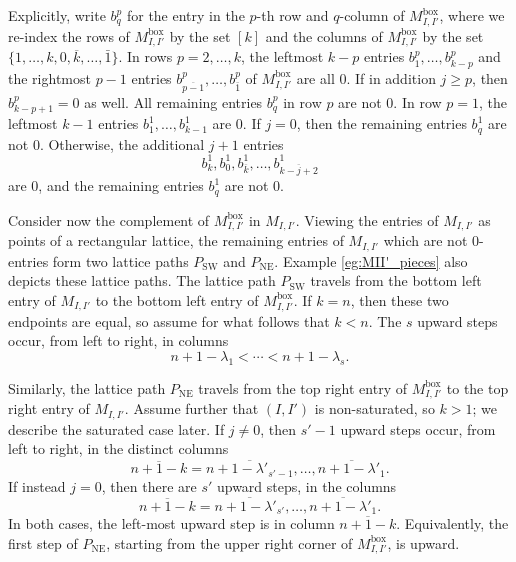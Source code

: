 \documentclass[12pt]{amsart}
\DeclareMathOperator{\inbox}{box}
\DeclareMathOperator{\NE}{NE}
\DeclareMathOperator{\SW}{SW}
\newcommand{\bark}{\overline{k}}
\begin{document}
Explicitly, write $b^p_q$ for the entry in the $p$-th row and $q$-column of $M^{\inbox}_{I,I'}$, where we re-index the rows of $M^{\inbox}_{I,I'}$ by the set $[k]$ and the columns of $M^{\inbox}_{I,I'}$ by the set $\{1,\ldots,k,0,\bark,\ldots, \bar1\}$. In rows $p=2,\ldots,k$, the leftmost $k-p$ entries $b^p_1,\ldots,b^p_{k-p}$ and the rightmost $p-1$ entries $b^p_{\overline{p-1}},\ldots,b^p_{\bar1}$ of $M^{\inbox}_{I,I'}$ are all 0. If in addition $j\ge p$, then $b^p_{k-p+1}=0$ as well. All remaining entries $b^p_q$ in row $p$ are not 0. In row $p=1$, the leftmost $k-1$ entries $b^1_1,\ldots,b^1_{k-1}$ are 0. If $j=0$, then the remaining entries $b^1_q$ are not 0. Otherwise, the additional $j+1$ entries
\begin{equation*}
    b^1_k,b^1_0,b^1_{\bark},\ldots,b^1_{\overline{k-j+2}}
\end{equation*}
are 0, and the remaining entries $b^1_q$ are not 0.

Consider now the complement of $M^{\inbox}_{I,I'}$ in $M_{I,I'}$. Viewing the entries of $M_{I,I'}$ as points of a rectangular lattice, the remaining entries of $M_{I,I'}$ which are not 0-entries form two lattice paths $P_{\SW}$ and $P_{\NE}$. Example \ref{eg:MII'_pieces} also depicts these lattice paths. The lattice path $P_{\SW}$ travels from the bottom left entry of $M_{I,I'}$ to the bottom left entry of $M_{I,I'}^{\inbox}$.  If $k=n$, then these two endpoints are equal, so assume for what follows that $k<n$. The $s$ upward steps occur, from left to right, in columns 
\begin{equation*}
    n+1-\lambda_1<\cdots<n+1-\lambda_s.
\end{equation*}

Similarly, the lattice path $P_{\NE}$ travels from the top right entry of $M_{I,I'}^{\inbox}$ to the top right entry of $M_{I,I'}$. Assume further that $(I,I')$ is non-saturated, so $k>1$; we describe the saturated case later. If $j\neq0$, then $s'-1$ upward steps occur, from left to right, in the distinct columns
\begin{equation*}
    \overline{n+1-k}=\overline{n+1-\lambda'_{s'-1}},\ldots,\overline{n+1-\lambda'_1}.
\end{equation*}
If instead $j=0$, then there are $s'$ upward steps, in the columns
\begin{equation*}
    \overline{n+1-k}=\overline{n+1-\lambda'_{s'}},\ldots,\overline{n+1-\lambda'_1}.
\end{equation*}
In both cases, the left-most upward step is in column $\overline{n+1-k}$. Equivalently, the first step of $P_{\NE}$, starting from the upper right corner of $M_{I,I'}^{\inbox}$, is upward. 
\end{document}
